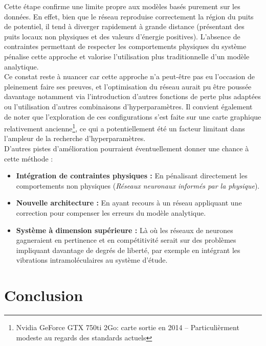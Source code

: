 \documentclass[11pt, a4paper, openany]{report}
\begin{document}
\noindent Cette étape confirme une limite propre aux modèles basés purement sur
les données. En effet, bien que le réseau reproduise correctement la région du
puits de potentiel, il tend à diverger rapidement à grande distance (présentant 
des puits locaux non physiques et des valeurs d'énergie positives). L'absence 
de contraintes permettant de respecter les comportements physiques du système
pénalise cette approche et valorise l'utilisation plus traditionnelle d'un 
modèle analytique.\\

\noindent Ce constat reste à nuancer car cette approche n'a peut-être pas 
eu l'occasion de pleinement faire ses preuves, et l'optimisation du réseau 
aurait pu être poussée davantage notamment via l'introduction d'autres 
fonctions de perte plus adaptées ou l'utilisation d'autres combinaisons
d'hyperparamètres. Il convient également de noter que l'exploration de ces 
configurations s'est faite sur une carte graphique relativement ancienne\footnote{Nvidia 
GeForce GTX 750ti 2Go: carte sortie en 2014 -- Particulièrment modeste au regards
des standards actuels}, ce qui a potentiellement été un facteur limitant dans 
l'ampleur de la recherche d'hyperparamètres.\\ 


\noindent D'autres pistes d'amélioration pourraient éventuellement donner une
chance à cette méthode :

\begin{itemize}
  \item \textbf{Intégration de contraintes physiques :} En pénalisant directement
    les comportements non physiques (\textit{Réseaux neuronaux informés par la physique}).
  \item \textbf{Nouvelle architecture :} En ayant recours à un réseau appliquant 
    une correction pour compenser les erreurs du modèle analytique.
  \item \textbf{Système à dimension supérieure :} Là où les réseaux de neurones
    gagneraient en pertinence et en compétitivité serait sur des problèmes
    impliquant davantage de degrés de liberté, par exemple en intégrant les 
    vibrations intramoléculaires au système d'étude.
\end{itemize}


\chapter{Conclusion}
\end{document}
